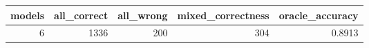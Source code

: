 \begin{tabular}{rrrrr}
\toprule
models & all\_correct & all\_wrong & mixed\_correctness & oracle\_accuracy \\
\midrule
6 & 1336 & 200 & 304 & 0.8913 \\
\bottomrule
\end{tabular}

